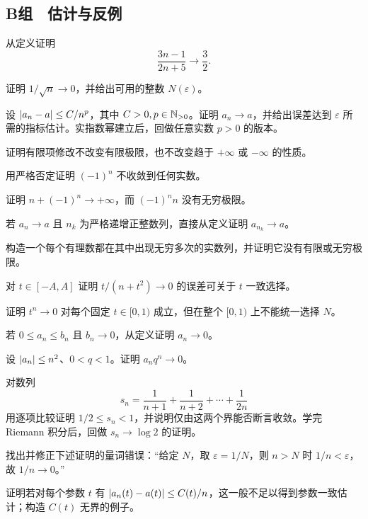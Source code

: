 \subsection*{B组　估计与反例}
\begin{enumerate}[label=\textbf{\thechapter.\arabic*.},ref=\thechapter.\arabic*,leftmargin=3.4em,labelsep=0.7em,itemsep=0.85em,topsep=0.8em,resume]
  从定义证明
 \[
 \frac{3n-1}{2n+5}\longrightarrow\frac32.
 \]

  证明 \(1/\sqrt n\to0\)，并给出可用的整数 \(N(\varepsilon)\)。

  设 \(\left|a_n-a\right|\le C/n^p\)，其中 \(C>0,p\in\mathbb{N}_{>0}\)。证明 \(a_n\to a\)，并给出误差达到 \(\varepsilon\) 所需的指标估计。实指数幂建立后，回做任意实数 \(p>0\) 的版本。

  证明有限项修改不改变有限极限，也不改变趋于 \(+\infty\) 或 \(-\infty\) 的性质。

  用严格否定证明 \((-1)^n\) 不收敛到任何实数。

  证明 \(n+(-1)^n\to+\infty\)，而 \((-1)^n n\) 没有无穷极限。

  若 \(a_n\to a\) 且 \(n_k\) 为严格递增正整数列，直接从定义证明 \(a_{n_k}\to a\)。

  构造一个每个有理数都在其中出现无穷多次的实数列，并证明它没有有限或无穷极限。

  对 \(t\in[-A,A]\) 证明 \(t/(n+t^2)\to0\) 的误差可关于 \(t\) 一致选择。

  证明 \(t^n\to0\) 对每个固定 \(t\in[0,1)\) 成立，但在整个 \([0,1)\) 上不能统一选择 \(N\)。

  若 \(0\le a_n\le b_n\) 且 \(b_n\to0\)，从定义证明 \(a_n\to0\)。

  设 \(\left|a_n\right|\le n^2\)、\(0<q<1\)。证明 \(a_nq^n\to0\)。

  对数列
 \[
 s_n=\frac1{n+1}+\frac1{n+2}+\cdots+\frac1{2n}
 \]
用逐项比较证明 \(1/2\le s_n<1\)，并说明仅由这两个界能否断言收敛。学完 Riemann 积分后，回做 \(s_n\to\log2\) 的证明。

  找出并修正下述证明的量词错误：“给定 \(N\)，取 \(\varepsilon=1/N\)，则 \(n>N\) 时 \(1/n<\varepsilon\)，故 \(1/n\to0\)。”

  证明若对每个参数 \(t\) 有 \(\left|a_n(t)-a(t)\right|\le C(t)/n\)，这一般不足以得到参数一致估计；构造 \(C(t)\) 无界的例子。


\end{enumerate}

